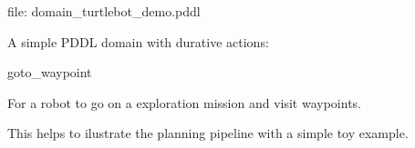 file\+: {\ttfamily domain\+\_\+turtlebot\+\_\+demo.\+pddl}

A simple PDDL domain with durative actions\+:

goto\+\_\+waypoint

For a robot to go on a exploration mission and visit waypoints.

This helps to ilustrate the planning pipeline with a simple toy example. 